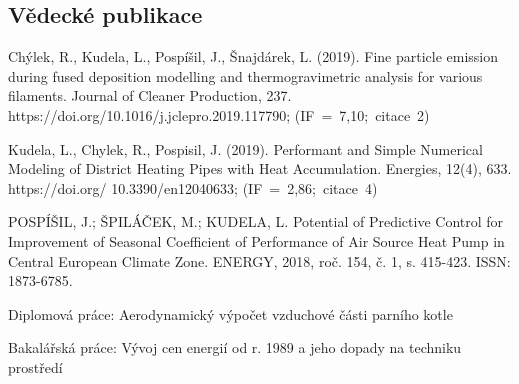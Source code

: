 \subsection*{Vědecké publikace}

\noindent Chýlek, R., Kudela, L., Pospíšil, J., Šnajdárek, L. (2019). Fine
particle emission during fused deposition modelling and thermogravimetric
analysis for various filaments. Journal of Cleaner Production, 237.
https://doi.org/10.1016/j.jclepro.2019.117790; \mbox{(IF = 7,10; citace 2)}
\smallskip

\noindent Kudela, L., Chylek, R., Pospisil, J. (2019). Performant and Simple
Numerical Modeling of District Heating Pipes with Heat Accumulation. Energies,
12(4), 633. https://doi.org/
10.3390/en12040633; \mbox{(IF = 2,86; citace 4)}
\smallskip

\noindent POSPÍŠIL, J.; ŠPILÁČEK, M.; KUDELA, L. Potential of Predictive
Control for Improvement of Seasonal Coefficient of Performance of Air Source
Heat Pump in Central European Climate Zone. ENERGY, 2018, roč. 154, č. 1, s. 
415-423. ISSN: 1873-6785. 

\smallskip
\noindent Diplomová práce: Aerodynamický výpočet vzduchové části parního kotle

\smallskip
\noindent Bakalářská práce: Vývoj cen energií od r. 1989 a jeho dopady na techniku prostředí


